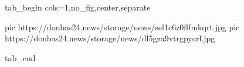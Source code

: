  
 
 
 
 


\ifcmt
  tab_begin cols=1,no_fig,center,separate

     pic https://donbas24.news/storage/news/sel1c6z0flfmkqrt.jpg
     pic https://donbas24.news/storage/news/dl5gza9vtrgpycrl.jpg

  tab_end
\fi
